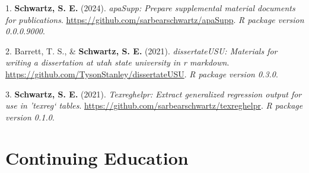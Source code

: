 \documentclass[11pt,a4paper,]{moderncv}
\newlength{\cslhangindent}
\newenvironment{CSLReferences}[2] %
 {\begin{list}{}{%
  \setlength{\itemindent}{0pt}
  \setlength{\leftmargin}{0pt}
  \setlength{\parsep}{0pt}
  \ifodd #1
   \setlength{\leftmargin}{\cslhangindent}
   \setlength{\itemindent}{-1\cslhangindent}
  \fi
  \setlength{\itemsep}{#2\baselineskip}}}
 {\end{list}}
\begin{document}
\label{refs-308572642dc97cd9783e85f3c92541cd}
\begin{CSLReferences}{1}{0}
1. \textbf{Schwartz, S. E.} (2024). \emph{apaSupp: Prepare supplemental
material documents for publications}.
\url{https://github.com/sarbearschwartz/apaSupp}. \emph{R package
version 0.0.0.9000}.

2. Barrett, T. S., \& \textbf{Schwartz, S. E.} (2021).
\emph{dissertateUSU: Materials for writing a dissertation at utah state
university in r markdown}.
\url{https://github.com/TysonStanley/dissertateUSU}. \emph{R package
version 0.3.0}.

3. \textbf{Schwartz, S. E.} (2021). \emph{Texreghelpr: Extract
generalized regression output for use in 'texreg` tables}.
\url{https://github.com/sarbearschwartz/texreghelpr}. \emph{R package
version 0.1.0}.

\end{CSLReferences}

\clearpage

\section{Continuing Education}\label{continuing-education}
\end{document}

